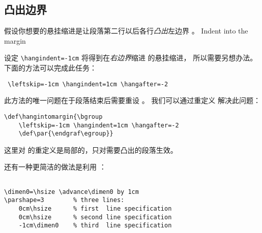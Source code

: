 \documentclass{book}
\begin{document}
\subsection{凸出边界}

假设你想要的悬挂缩进是让段落第二行以后各行{\sl 凸出\/}左边界 \n{1cm}。
\howto Indent into the margin\par
设定 \verb/\hangindent=-1cm/ 将得到在{\sl 右边界\/}缩进 \n{1cm} 的悬挂缩进，
所以需要另想办法。下面的方法可以完成此任务：
\begin{verbatim}
 \leftskip=-1cm \hangindent=1cm \hangafter=-2
\end{verbatim}
此方法的唯一问题在于段落结束后需要重设 。
我们可以通过重定义  解决此问题：
\begin{verbatim}
\def\hangintomargin{\bgroup
    \leftskip=-1cm \hangindent=1cm \hangafter=-2
    \def\par{\endgraf\egroup}}
\end{verbatim}
这里对  的重定义是局部的，只对需要凸出的段落生效。

% 
还有一种更简洁的做法是利用 ：
\begin{verbatim}
 
\dimen0=\hsize \advance\dimen0 by 1cm
\parshape=3        % three lines:
    0cm\hsize      % first  line specification
    0cm\hsize      % second line specification
    -1cm\dimen0    % third  line specification
\end{verbatim}
\end{document}
